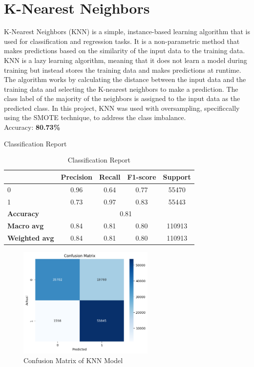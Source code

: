 \section{K-Nearest Neighbors}

K-Nearest Neighbors (KNN) is a simple, instance-based learning algorithm that is used for classification and regression tasks. It is a non-parametric method that makes predictions based on the similarity of the input data to the training data. KNN is a lazy learning algorithm, meaning that it does not learn a model during training but instead stores the training data and makes predictions at runtime. The algorithm works by calculating the distance between the input data and the training data and selecting the K-nearest neighbors to make a prediction. The class label of the majority of the neighbors is assigned to the input data as the predicted class. In this project, KNN was used with oversampling, specificcally using the SMOTE technique, to address the class imbalance.\\

Accuracy: \textbf{80.73\%}


Classification Report
\begin{table}[h]
    \centering
    \begin{tabular}{lcccc}
        \toprule
        & \textbf{Precision} & \textbf{Recall} & \textbf{F1-score} & \textbf{Support} \\
        \midrule
        0 & 0.96 & 0.64 & 0.77 & 55470 \\
        1 & 0.73 & 0.97 & 0.83 & 55443 \\
        \midrule
        \textbf{Accuracy} & \multicolumn{4}{c}{0.81} \\
        \textbf{Macro avg} & 0.84 & 0.81 & 0.80 & 110913 \\
        \textbf{Weighted avg} & 0.84 & 0.81 & 0.80 & 110913 \\
        \bottomrule
    \end{tabular}
    \caption{Classification Report}
    \label{tab:classification_report}
\end{table}

\begin{figure}[h] 
    \centering 
    \includegraphics[width=0.6\textwidth]{media/knn_confusion_matrix.png}
    \caption{Confusion Matrix of KNN Model}

\end{figure}

